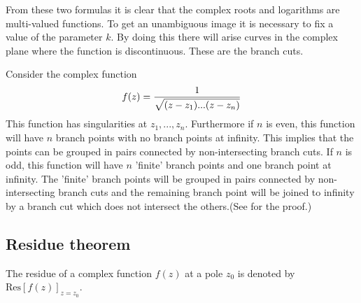 	From these two formulas it is clear that the complex roots and logarithms are multi-valued functions. To get an unambiguous image it is necessary to fix a value of the parameter $k$. By doing this there will arise curves in the complex plane where the function is discontinuous. These are the branch cuts.
    
    \begin{example}
		Consider the complex function \[f(z) = \stylefrac{1}{\sqrt{(z-z_1)...(z-z_n)}}\] This function has singularities at $z_1,...,z_n$. Furthermore if $n$ is even, this function will have $n$ branch points with no branch points at infinity. This implies that the points can be grouped in pairs connected by non-intersecting branch cuts. If $n$ is odd, this function will have $n$ 'finite' branch points and one branch point at infinity. The 'finite' branch points will be grouped in pairs connected by non-intersecting branch cuts and the remaining branch point will be joined to infinity by a branch cut which does not intersect the others.(See \cite{branchcut} for the proof.)
	\end{example}
    
\subsection{Residue theorem}
	
	\begin{notation}
		The residue of a complex function $f(z)$ at a pole $z_0$ is denoted by $\text{Res}[f(z)]_{z=z_0}$.
	\end{notation}
	
